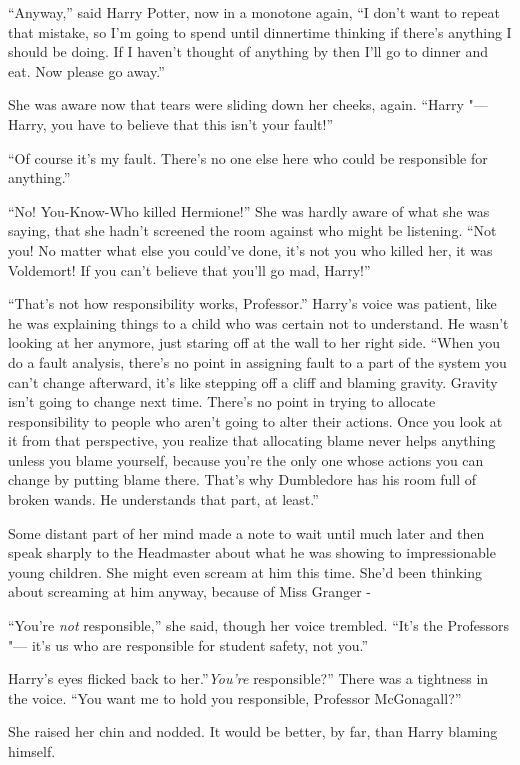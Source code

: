 ``Anyway,'' said Harry Potter, now in a monotone again, ``I don't want
to repeat that mistake, so I'm going to spend until dinnertime thinking
if there's anything I should be doing. If I haven't thought of anything
by then I'll go to dinner and eat. Now please go away.''

She was aware now that tears were sliding down her cheeks, again.
``Harry "--- Harry, you have to believe that this isn't your fault!''

``Of course it's my fault. There's no one else here who could be
responsible for anything.''

``No! You-Know-Who killed Hermione!'' She was hardly aware of what she
was saying, that she hadn't screened the room against who might be
listening. ``Not you! No matter what else you could've done, it's not
you who killed her, it was Voldemort! If you can't believe that you'll
go mad, Harry!''

``That's not how responsibility works, Professor.'' Harry's voice was
patient, like he was explaining things to a child who was certain not to
understand. He wasn't looking at her anymore, just staring off at the
wall to her right side. ``When you do a fault analysis, there's no point
in assigning fault to a part of the system you can't change afterward,
it's like stepping off a cliff and blaming gravity. Gravity isn't going
to change next time. There's no point in trying to allocate
responsibility to people who aren't going to alter their actions. Once
you look at it from that perspective, you realize that allocating blame
never helps anything unless you blame yourself, because you're the only
one whose actions you can change by putting blame there. That's why
Dumbledore has his room full of broken wands. He understands that part,
at least.''

Some distant part of her mind made a note to wait until much later and
then speak sharply to the Headmaster about what he was showing to
impressionable young children. She might even scream at him this time.
She'd been thinking about screaming at him anyway, because of Miss
Granger -

``You're \emph{not} responsible,'' she said, though her voice trembled.
``It's the Professors "--- it's us who are responsible for student safety,
not you.''

Harry's eyes flicked back to her.''\emph{You're} responsible?'' There
was a tightness in the voice. ``You want me to hold you responsible,
Professor McGonagall?''

She raised her chin and nodded. It would be better, by far, than Harry
blaming himself.

